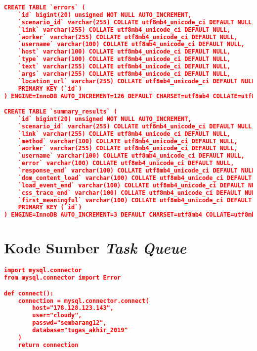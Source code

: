\begin{lstlisting}[frame=single,tabsize=2,breaklines,caption={Basis data MySQL},label=mysql, captionpos=b, language=json]
CREATE TABLE `errors` (
	`id` bigint(20) unsigned NOT NULL AUTO_INCREMENT,
	`scenario_id` varchar(255) COLLATE utf8mb4_unicode_ci DEFAULT NULL,
	`link` varchar(255) COLLATE utf8mb4_unicode_ci DEFAULT NULL,
	`worker` varchar(255) COLLATE utf8mb4_unicode_ci DEFAULT NULL,
	`username` varchar(100) COLLATE utf8mb4_unicode_ci DEFAULT NULL,
	`host` varchar(100) COLLATE utf8mb4_unicode_ci DEFAULT NULL,
	`type` varchar(100) COLLATE utf8mb4_unicode_ci DEFAULT NULL,
	`text` varchar(255) COLLATE utf8mb4_unicode_ci DEFAULT NULL,
	`args` varchar(255) COLLATE utf8mb4_unicode_ci DEFAULT NULL,
	`location_url` varchar(255) COLLATE utf8mb4_unicode_ci DEFAULT NULL,
	PRIMARY KEY (`id`)
) ENGINE=InnoDB AUTO_INCREMENT=126 DEFAULT CHARSET=utf8mb4 COLLATE=utf8mb4_unicode_ci;

CREATE TABLE `summary_results` (
	`id` bigint(20) unsigned NOT NULL AUTO_INCREMENT,
	`scenario_id` varchar(255) COLLATE utf8mb4_unicode_ci DEFAULT NULL,
	`link` varchar(255) COLLATE utf8mb4_unicode_ci DEFAULT NULL,
	`method` varchar(100) COLLATE utf8mb4_unicode_ci DEFAULT NULL,
	`worker` varchar(255) COLLATE utf8mb4_unicode_ci DEFAULT NULL,
	`username` varchar(100) COLLATE utf8mb4_unicode_ci DEFAULT NULL,
	`error` varchar(100) COLLATE utf8mb4_unicode_ci DEFAULT NULL,
	`response_end` varchar(100) COLLATE utf8mb4_unicode_ci DEFAULT NULL,
	`dom_content_load` varchar(100) COLLATE utf8mb4_unicode_ci DEFAULT NULL,
	`load_event_end` varchar(100) COLLATE utf8mb4_unicode_ci DEFAULT NULL,
	`css_trace_end` varchar(100) COLLATE utf8mb4_unicode_ci DEFAULT NULL,
	`first_meaningful` varchar(100) COLLATE utf8mb4_unicode_ci DEFAULT NULL,
	PRIMARY KEY (`id`)
) ENGINE=InnoDB AUTO_INCREMENT=3 DEFAULT CHARSET=utf8mb4 COLLATE=utf8mb4_unicode_ci;
\end{lstlisting}

\section*{Kode Sumber \textit{Task Queue}} \label{taskqueue}

\begin{lstlisting}[frame=single,tabsize=2,breaklines,caption={Isi berkas connection.py},label=connectionpy, captionpos=b, language=json]
import mysql.connector
from mysql.connector import Error

def connect():
	connection = mysql.connector.connect(
		host="178.128.123.143",
		user="cloudy",
		passwd="sembarang12",
		database="tugas_akhir_2019"
	)
	return connection
\end{lstlisting}


